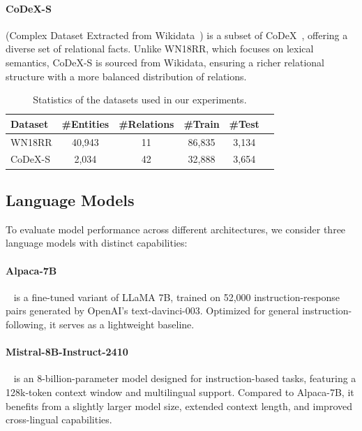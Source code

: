 \documentclass[12pt,a4paper]{article}
\begin{document}
\paragraph{CoDeX-S} (Complex Dataset Extracted from Wikidata~\cite{wikidata}) is a subset of CoDeX~\cite{safavi2020codex}, offering a diverse set of relational facts.
Unlike WN18RR, which focuses on lexical semantics, CoDeX-S is sourced from Wikidata, ensuring a richer relational structure with a more balanced distribution of relations.

\begin{table}
    \centering
    \begin{tabular}{l c c c c c}
        \hline
        Dataset & \#Entities & \#Relations & \#Train & \#Test \\
        \hline
        WN18RR & 40,943 & 11 & 86,835 & 3,134 \\
        CoDeX-S & 2,034 & 42 & 32,888 & 3,654 \\
        \hline
    \end{tabular}
    \caption{Statistics of the datasets used in our experiments.}
    \label{tab:datasets}
\end{table}

\subsection{Language Models}

To evaluate model performance across different architectures, we consider three language models with distinct capabilities:

\paragraph{Alpaca-7B}~\cite{taori2023stanford} is a fine-tuned variant of LLaMA 7B, trained on 52,000 instruction-response pairs generated by OpenAI’s text-davinci-003.
Optimized for general instruction-following, it serves as a lightweight baseline.

\paragraph{Mistral-8B-Instruct-2410}~\cite{mistralai2024ministral8b} is an 8-billion-parameter model designed for instruction-based tasks, featuring a 128k-token context window and multilingual support.
Compared to Alpaca-7B, it benefits from a slightly larger model size, extended context length, and improved cross-lingual capabilities.
\end{document}
